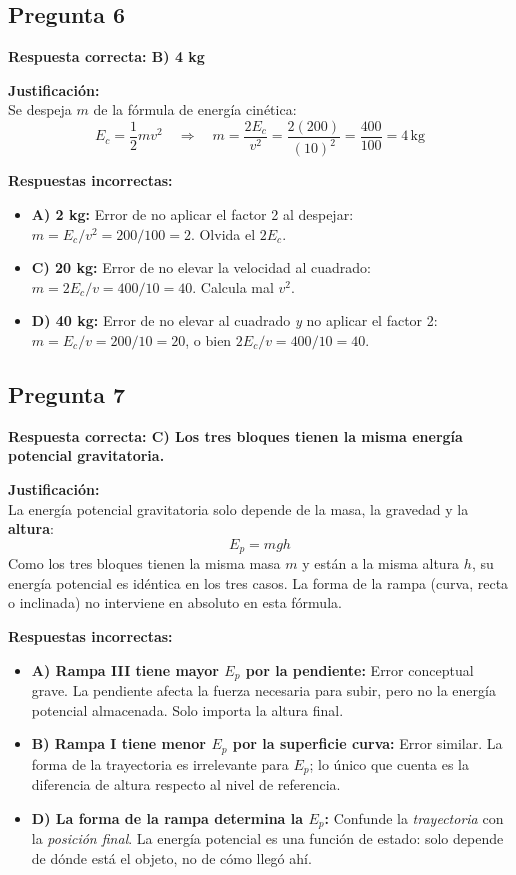 \begin{respuestabox}
\subsection{Pregunta 6}
\textcolor{verdecorrecto}{\textbf{Respuesta correcta: B) 4 kg}}

\textbf{Justificación:}\\
Se despeja $m$ de la fórmula de energía cinética:
$$E_c = \frac{1}{2}mv^2 \quad \Rightarrow \quad m = \frac{2E_c}{v^2} = \frac{2(200)}{(10)^2} = \frac{400}{100} = 4\,\text{kg}$$

\textbf{Respuestas incorrectas:}
\begin{itemize}
    \item \textbf{A) 2 kg:} Error de no aplicar el factor 2 al despejar: $m = E_c / v^2 = 200/100 = 2$. Olvida el $2E_c$.
    \item \textbf{C) 20 kg:} Error de no elevar la velocidad al cuadrado: $m = 2E_c / v = 400/10 = 40$. Calcula mal $v^2$.
    \item \textbf{D) 40 kg:} Error de no elevar al cuadrado \textit{y} no aplicar el factor 2: $m = E_c/v = 200/10 = 20$, o bien $2E_c/v = 400/10 = 40$.
\end{itemize}
\end{respuestabox}

\newpage

\begin{respuestabox}
\subsection{Pregunta 7}
\textcolor{verdecorrecto}{\textbf{Respuesta correcta: C) Los tres bloques tienen la misma energía potencial gravitatoria.}}

\textbf{Justificación:}\\
La energía potencial gravitatoria solo depende de la masa, la gravedad y la \textbf{altura}:
$$E_p = mgh$$
Como los tres bloques tienen la misma masa $m$ y están a la misma altura $h$, su energía potencial es idéntica en los tres casos. La forma de la rampa (curva, recta o inclinada) no interviene en absoluto en esta fórmula.

\textbf{Respuestas incorrectas:}
\begin{itemize}
    \item \textbf{A) Rampa III tiene mayor $E_p$ por la pendiente:} Error conceptual grave. La pendiente afecta la fuerza necesaria para subir, pero no la energía potencial almacenada. Solo importa la altura final.
    \item \textbf{B) Rampa I tiene menor $E_p$ por la superficie curva:} Error similar. La forma de la trayectoria es irrelevante para $E_p$; lo único que cuenta es la diferencia de altura respecto al nivel de referencia.
    \item \textbf{D) La forma de la rampa determina la $E_p$:} Confunde la \textit{trayectoria} con la \textit{posición final}. La energía potencial es una función de estado: solo depende de dónde está el objeto, no de cómo llegó ahí.
\end{itemize}
\end{respuestabox}


